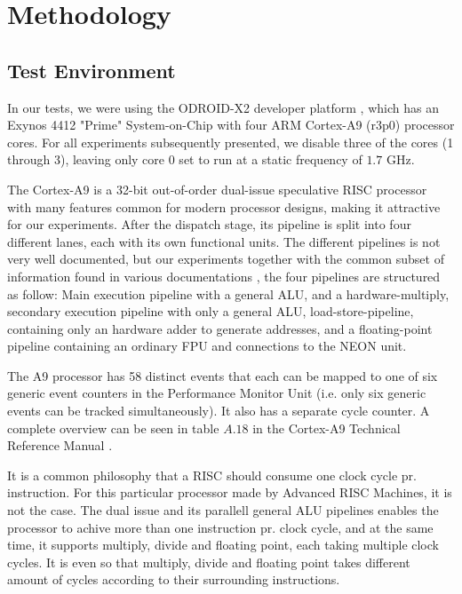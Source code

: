 \section{Methodology}


\subsection{Test Environment}
In our tests, we were using the ODROID-X2 \cite{odroid-x2} developer platform ,
which has an Exynos 4412 "Prime" System-on-Chip with four ARM Cortex-A9 (r3p0) 
processor cores. For all experiments subsequently presented, we disable three of
the cores (1 through 3), leaving only core 0 set to run at a static frequency of
$1.7$ GHz.

The Cortex-A9 is a 32-bit out-of-order dual-issue speculative RISC processor
with many features common for modern processor designs, making it attractive for
our experiments. After the dispatch stage, its pipeline is split into four
different lanes, each with its own functional units. The different pipelines is
not very well documented, but our experiments together with the common subset of
information found in various documentations
\cite{armtech}\cite{7cpu}\cite{lotofdocs}, the four pipelines are structured as
follow: Main execution pipeline with a general ALU, and a hardware-multiply,
secondary execution pipeline with only a general ALU, load-store-pipeline,
containing only an hardware adder to generate addresses, and a floating-point
pipeline containing an ordinary FPU and connections to the NEON unit.

The A9 processor has 58 distinct events that each can be mapped to one of six
generic event counters in the Performance Monitor Unit (i.e. only six generic
events can be tracked simultaneously). It also has a separate cycle counter. A
complete overview can be seen in table $A.18$ in the Cortex-A9 Technical
Reference Manual \cite{armtech}.


It is a common philosophy that a RISC should consume one clock cycle pr.
instruction\cite{unknown}. For this particular processor made by Advanced RISC
Machines, it is not the case. The dual issue and its parallell general ALU
pipelines enables the processor to achive more than one instruction pr. clock
cycle, and at the same time, it supports multiply, divide and floating point,
each taking multiple clock cycles. It is even so that multiply, divide and
floating point takes different amount of cycles according to their surrounding
instructions.


